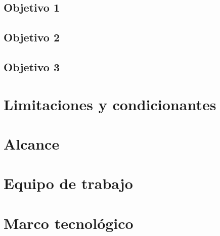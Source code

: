 \subsection{Objetivo 1}

\subsection{Objetivo 2}

\subsection{Objetivo 3}

\section{Limitaciones y condicionantes}
\section{Alcance}
\section{Equipo de trabajo}
\section{Marco tecnológico}



